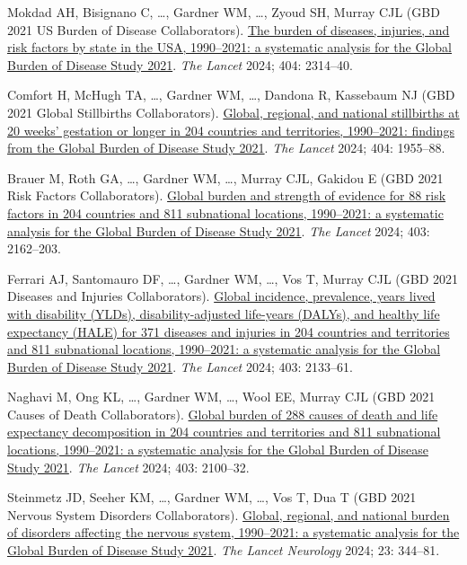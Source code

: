 \documentclass[11pt,article,oneside]{memoir}
\begin{document}
\begin{publist}
\item Mokdad AH, Bisignano C, \ldots, {\minbold Gardner WM}, \ldots, Zyoud SH, Murray CJL (GBD 2021 US Burden of Disease Collaborators). \href{https://doi.org/10.1016/S0140-6736(24)01446-6}{The burden of diseases, injuries, and risk factors by state in the USA, 1990–2021: a systematic analysis for the Global Burden of Disease Study 2021}. \emph{The Lancet} 2024; 404: 2314--40.

\item Comfort H, McHugh TA, \ldots, {\minbold Gardner WM}, \ldots, Dandona R, Kassebaum NJ (GBD 2021 Global Stillbirths Collaborators). \href{https://doi.org/10.1016/S0140-6736(24)01925-1}{Global, regional, and national stillbirths at 20 weeks' gestation or longer in 204 countries and territories, 1990–2021: findings from the Global Burden of Disease Study 2021}. \emph{The Lancet} 2024; 404: 1955--88.

\item Brauer M, Roth GA, \ldots, {\minbold Gardner WM}, \ldots, Murray CJL, Gakidou E (GBD 2021 Risk Factors Collaborators). \href{https://doi.org/10.1016/S0140-6736(24)00933-4}{Global burden and strength of evidence for 88 risk factors in 204 countries and 811 subnational locations, 1990–2021: a systematic analysis for the Global Burden of Disease Study 2021}. \emph{The Lancet} 2024; 403: 2162--203.

\item Ferrari AJ, Santomauro DF, \ldots, {\minbold Gardner WM}, \ldots, Vos T, Murray CJL (GBD 2021 Diseases and Injuries Collaborators). \href{https://doi.org/10.1016/S0140-6736(24)00757-8}{Global incidence, prevalence, years lived with disability (YLDs), disability-adjusted life-years (DALYs), and healthy life expectancy (HALE) for 371 diseases and injuries in 204 countries and territories and 811 subnational locations, 1990–2021: a systematic analysis for the Global Burden of Disease Study 2021}. \emph{The Lancet} 2024; 403: 2133--61.

\item Naghavi M, Ong KL, \ldots, {\minbold Gardner WM}, \ldots, Wool EE, Murray CJL (GBD 2021 Causes of Death Collaborators). \href{https://doi.org/10.1016/S0140-6736(24)00367-2}{Global burden of 288 causes of death and life expectancy decomposition in 204 countries and territories and 811 subnational locations, 1990–2021: a systematic analysis for the Global Burden of Disease Study 2021}. \emph{The Lancet} 2024; 403: 2100--32.

\item Steinmetz JD, Seeher KM, \ldots, {\minbold Gardner WM}, \ldots, Vos T, Dua T (GBD 2021 Nervous System Disorders Collaborators). \href{https://doi.org/10.1016/S1474-4422(24)00038-3}{Global, regional, and national burden of disorders affecting the nervous system, 1990–2021: a systematic analysis for the Global Burden of Disease Study 2021}. \emph{The Lancet Neurology} 2024; 23: 344--81.


\end{publist}
\end{document}
